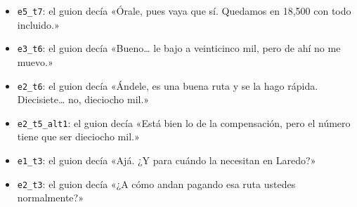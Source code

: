 \begin{itemize}[leftmargin=1.2cm,itemsep=0pt]
\item \texttt{e5\_t7}: el guion decía «Órale, pues vaya que sí. Quedamos en 18,500 con todo incluido.»
\item \texttt{e3\_t6}: el guion decía «Bueno… le bajo a veinticinco mil, pero de ahí no me muevo.»
\item \texttt{e2\_t6}: el guion decía «Ándele, es una buena ruta y se la hago rápida. Diecisiete… no, dieciocho mil.»
\item \texttt{e2\_t5\_alt1}: el guion decía «Está bien lo de la compensación, pero el número tiene que ser dieciocho mil.»
\item \texttt{e1\_t3}: el guion decía «Ajá. ¿Y para cuándo la necesitan en Laredo?»
\item \texttt{e2\_t3}: el guion decía «¿A cómo andan pagando esa ruta ustedes normalmente?»
\end{itemize}
